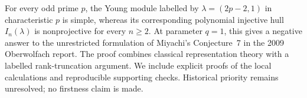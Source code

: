 For every odd prime \(p\), the Young module labelled by
\(\lambda=(2p-2,1)\) in characteristic \(p\) is simple, whereas its corresponding
polynomial injective hull \(I_n(\lambda)\) is nonprojective for every \(n\ge2\).
At parameter \(q=1\), this gives a negative answer to the unrestricted
formulation of Miyachi's Conjecture~7 in the 2009 Oberwolfach report.
The proof combines classical representation theory with a labelled
rank-truncation argument. We include explicit proofs of the local calculations
and reproducible supporting checks. Historical priority remains unresolved;
no firstness claim is made.
